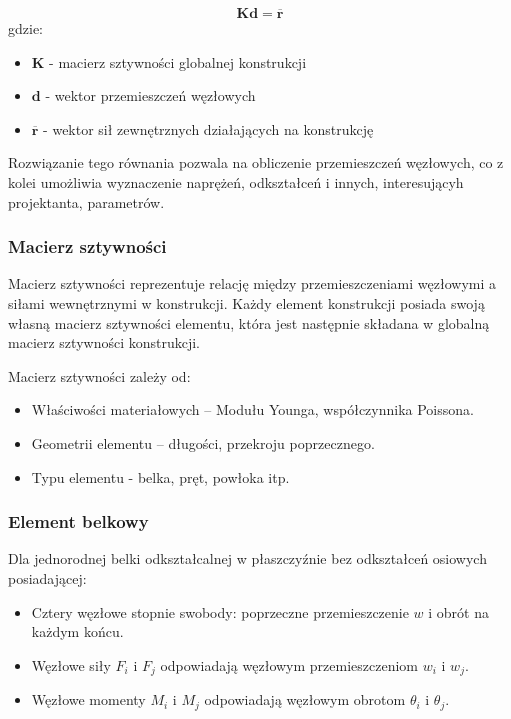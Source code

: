 \begin{equation}
\label{eq:mes}
    \bm{Kd} = \overline{\bm{r}}
\end{equation}
gdzie:

\begin{itemize}
    \item $\bm{K}$ - macierz sztywności globalnej konstrukcji
    \item $\bm{d}$ - wektor przemieszczeń węzłowych
    \item $\overline{\bm{r}}$ - wektor sił zewnętrznych działających na konstrukcję
\end{itemize}

Rozwiązanie tego równania pozwala na obliczenie przemieszczeń węzłowych, co z kolei umożliwia wyznaczenie naprężeń, odkształceń i innych, interesującyh projektanta, parametrów.

\subsubsection{Macierz sztywności}

Macierz sztywności reprezentuje relację między przemieszczeniami węzłowymi a siłami wewnętrznymi w konstrukcji.
Każdy element konstrukcji posiada swoją własną macierz sztywności elementu, która jest następnie składana w globalną macierz sztywności konstrukcji.

Macierz sztywności zależy od:

\begin{itemize}
    \item Właściwości materiałowych – Modułu Younga, współczynnika Poissona.
    \item Geometrii elementu – długości, przekroju poprzecznego.
    \item Typu elementu - belka, pręt, powłoka itp.
\end{itemize}

\subsubsection{Element belkowy}

Dla jednorodnej belki odkształcalnej w płaszczyźnie bez odkształceń osiowych posiadającej:

\begin{itemize}
    \item Cztery węzłowe stopnie swobody: poprzeczne przemieszczenie $w$ i obrót \theta na każdym końcu.
    \item Węzłowe siły $F_i$ i $F_j$ odpowiadają węzłowym przemieszczeniom $w_i$ i $w_j$.
    \item Węzłowe momenty $M_i$ i $M_j$ odpowiadają węzłowym obrotom $\theta_i$ i $\theta_j$.
\end{itemize}

